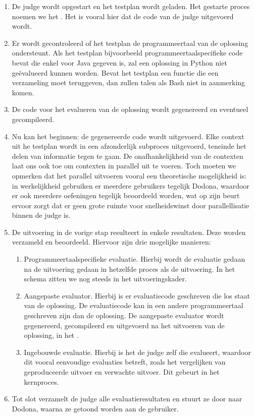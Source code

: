\begin{enumerate}
    \item De judge wordt opgestart en het testplan wordt geladen.
    Het gestarte proces noemen we het .
    Het is vooral hier dat de code van de judge uitgevoerd wordt.
    \item Er wordt gecontroleerd of het testplan de programmeertaal van de oplossing ondersteunt.
    Als het testplan bijvoorbeeld programmeertaalspecifieke code bevat die enkel voor Java gegeven is, zal een oplossing in Python niet geëvalueerd kunnen worden.
    Bevat het testplan een functie die een verzameling moet teruggeven, dan zullen talen als Bash niet in aanmerking komen.
    \item De code voor het evalueren van de oplossing wordt gegenereerd en eventueel gecompileerd.
    \item Nu kan het  beginnen: de gegenereerde code wordt uitgevoerd.
    Elke context uit he testplan wordt in een afzonderlijk subproces uitgevoerd, teneinde het delen van informatie tegen te gaan.
    De onafhankelijkheid van de contexten laat ons ook toe om contexten in parallel uit te voeren.
    Toch moeten we opmerken dat het parallel uitvoeren vooral een theoretische mogelijkheid is: in werkelijkheid gebruiken er meerdere gebruikers tegelijk Dodona, waardoor er ook meerdere oefeningen tegelijk beoordeeld worden, wat op zijn beurt ervoor zorgt dat er geen grote ruimte voor snelheidswinst door parallellisatie binnen de judge is.
    \item De uitvoering in de vorige stap resulteert in enkele resultaten.
    Deze worden verzameld en beoordeeld.
    Hiervoor zijn drie mogelijke manieren:
    \begin{enumerate}
        \item Programmeertaalspecifieke evaluatie.
        Hierbij wordt de evaluatie gedaan na de uitvoering gedaan in hetzelfde proces als de uitvoering.
        In het schema zitten we nog steeds in het uitvoeringskader.
        \item Aangepaste evaluator.
        Hierbij is er evaluatiecode geschreven die los staat van de oplossing.
        De evaluatiecode kan in een andere programmeertaal geschreven zijn dan de oplossing.
        De aangepaste evaluator wordt gegenereerd, gecompileerd en uitgevoerd na het uitvoeren van de oplossing, in het .
        \item Ingebouwde evaluatie.
        Hierbij is het de judge zelf die evalueert, waardoor dit vooral eenvoudige evaluaties betreft, zoals het vergelijken van geproduceerde uitvoer en verwachte uitvoer.
        Dit gebeurt in het kernproces.
    \end{enumerate}
    \item Tot slot verzamelt de judge alle evaluatieresultaten en stuurt ze door naar Dodona, waarna ze getoond worden aan de gebruiker.
\end{enumerate}


